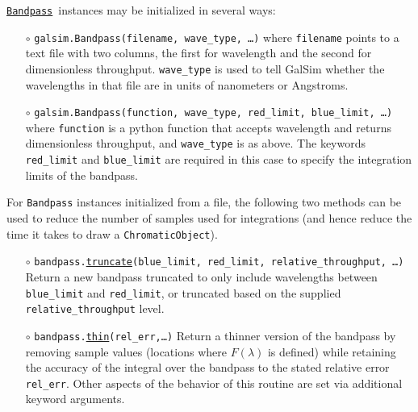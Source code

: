 \documentclass[preprint,10pt]{../../devel/modules/aastex}
\newcommand\Bandpass{\href{http://galsim-developers.github.io/GalSim/classgalsim_1_1bandpass_1_1_bandpass.html}{\texttt{Bandpass}}}
\begin{document}
\Bandpass\ instances may be initialized in several ways:
\begin{itemize}
  \item[$\circ$]
  \texttt{galsim.Bandpass(filename, wave\_type, \dots)}
    \newline
    where \texttt{filename} points to a
    text file with two columns, the first for wavelength and the second for dimensionless
    throughput.  \texttt{wave\_type} is used to tell GalSim whether the wavelengths in that file are
    in units of nanometers or Angstroms.
  \item[$\circ$]
  \texttt{galsim.Bandpass(function, wave\_type, red\_limit, blue\_limit, \dots)}
    \newline
    where \texttt{function} is a python function that accepts wavelength and returns
    dimensionless throughput, and \texttt{wave\_type} is as above.
    The keywords \texttt{red\_limit} and \texttt{blue\_limit} are required in
    this case to specify the integration limits of the bandpass.
\end{itemize}

For \texttt{Bandpass} instances initialized from a file, the following two methods can be used to
reduce the number of samples used for integrations (and hence reduce the time it takes to draw
a \texttt{ChromaticObject}).
\begin{itemize}
  \item[$\circ$]
  \texttt{bandpass.\href{http://galsim-developers.github.io/GalSim/classgalsim_1_1bandpass_1_1_bandpass.html\#a230865a1e29ed8a95ea4b2c7d66a08a1}{truncate}(blue\_limit,
    red\_limit, relative\_throughput, \dots)}
    \newline
    Return a new bandpass truncated to only include wavelengths between \texttt{blue\_limit} and
    \texttt{red\_limit}, or truncated based on the supplied \texttt{relative\_throughput} level.
  \item[$\circ$]
  \texttt{bandpass.\href{http://galsim-developers.github.io/GalSim/classgalsim_1_1bandpass_1_1_bandpass.html\#a20a7b1813506e7441e03ef097f0d5bf1}{thin}(rel\_err,\dots)}
    \newline
   Return a thinner version of the bandpass by removing sample values (locations where
   $F(\lambda)$ is defined) while retaining the
   accuracy of the integral over the bandpass to the stated relative error \texttt{rel\_err}.  Other
   aspects of the behavior of this routine are set via additional keyword arguments.
\end{itemize}
\end{document}

